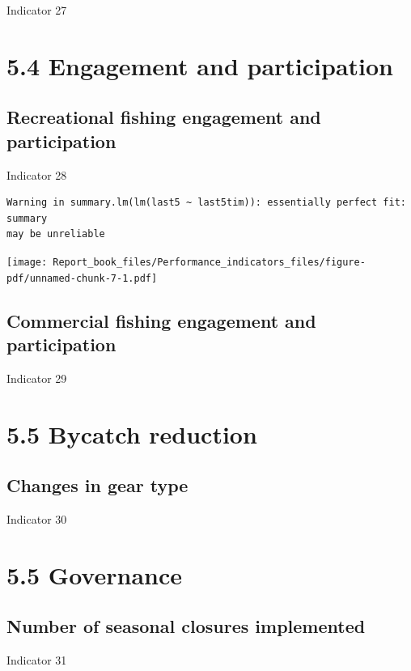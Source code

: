 \documentclass[
  letterpaper,
  oneside,
  open=any]{scrbook}
\begin{document}
Indicator 27

\section{5.4 Engagement and
participation}\label{engagement-and-participation}

\subsection{Recreational fishing engagement and
participation}\label{recreational-fishing-engagement-and-participation}

Indicator 28

\begin{verbatim}
Warning in summary.lm(lm(last5 ~ last5tim)): essentially perfect fit: summary
may be unreliable
\end{verbatim}

\texttt{[image: Report\_book\_files/Performance\_indicators\_files/figure-pdf/unnamed-chunk-7-1.pdf]}

\subsection{Commercial fishing engagement and
participation}\label{commercial-fishing-engagement-and-participation}

Indicator 29

\section{5.5 Bycatch reduction}\label{bycatch-reduction}

\subsection{Changes in gear type}\label{changes-in-gear-type}

Indicator 30

\section{5.5 Governance}\label{governance}

\subsection{Number of seasonal closures
implemented}\label{number-of-seasonal-closures-implemented}

Indicator 31
\end{document}

